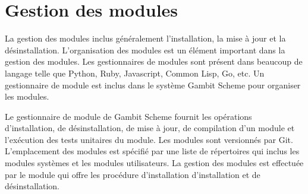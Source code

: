 
\chapter{Gestion des modules}
\label{ch:module_management}
La gestion des modules inclus généralement l'installation, la mise à jour et
la désinstallation. L'organisation des modules est un élément important
dans la gestion des modules. Les gestionnaires de modules sont présent dans
beaucoup de langage telle que Python, Ruby, Javascript, Common Lisp, Go, etc.
Un gestionnaire de module est inclus dans le système Gambit Scheme pour
organiser les modules.

Le gestionnaire de module de Gambit Scheme fournit les opérations
d'installation, de désinstallation, de mise à jour, de compilation
d'un module et l'exécution des tests unitaires du module. Les modules
sont versionnés par Git. L'emplacement des modules est spécifié par
une liste de répertoires qui inclus les modules systèmes et les modules
utilisateurs. La gestion des modules est effectuée par le module 
qui offre les procédure d'installation d'installation et de désinstallation.





